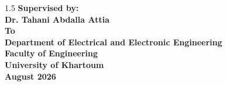 \documentclass[12pt,a4paper]{report}
\begin{document}
\begin{titlepage}
\begin{center}
\begin{spacing}{1.5}
        \textbf{Supervised by:}\\[0.5cm]
        {\textbf{Dr. Tahani Abdalla Attia}}\\[1cm]
        \textbf{To}\\[0.5cm]
        {\textbf{Department of Electrical and Electronic Engineering}}\\
        {\textbf{Faculty of Engineering}}\\
        {\textbf{University of Khartoum}}\\[1.5cm]
        \textbf{August 2026}
        \end{spacing}
    \end{center}
\end{titlepage}

\setcounter{page}{2}






\tableofcontents
\newpage
\listoffigures
\newpage
\listoftables








\end{document}
